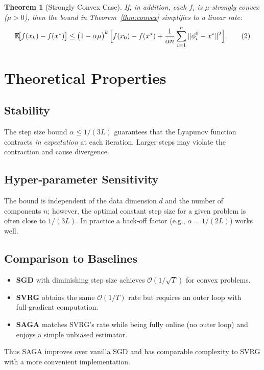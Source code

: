 \documentclass{article}
\newtheorem{theorem}{Theorem}[section]
\begin{document}
\begin{theorem}[Strongly Convex Case]\label{thm:strong}
If, in addition, each $f_i$ is $\mu$‑strongly convex ($\mu>0$), then the bound in Theorem~\ref{thm:convex} simplifies to a linear rate:
\[
\mathbb{E}\!\bigl[f(x_k)-f(x^\star)\bigr]\le
\bigl(1-\alpha\mu\bigr)^{k}\,
\Bigl[f(x_0)-f(x^\star)
      +\frac{1}{\alpha n}\sum_{i=1}^{n}\|\phi_i^{0}-x^\star\|^{2}\Bigr].
\tag{2}
\]
\end{theorem}

\section{Theoretical Properties}
\subsection{Stability}
The step size bound $\alpha\le1/(3L)$ guarantees that the Lyapunov function contracts \emph{in expectation} at each iteration. Larger steps may violate the contraction and cause divergence.

\subsection{Hyper‑parameter Sensitivity}
The bound is independent of the data dimension $d$ and the number of components $n$; however, the optimal constant step size for a given problem is often close to $1/(3L)$. In practice a back‑off factor (e.g., $\alpha=1/(2L)$) works well.

\subsection{Comparison to Baselines}
\begin{itemize}
\item \textbf{SGD} with diminishing step size achieves $\mathcal{O}(1/\sqrt{T})$ for convex problems.
\item \textbf{SVRG} obtains the same $\mathcal{O}(1/T)$ rate but requires an outer loop with full‑gradient computation.
\item \textbf{SAGA} matches SVRG’s rate while being fully online (no outer loop) and enjoys a simple unbiased estimator.
\end{itemize}
Thus SAGA improves over vanilla SGD and has comparable complexity to SVRG with a more convenient implementation.
\end{document}
